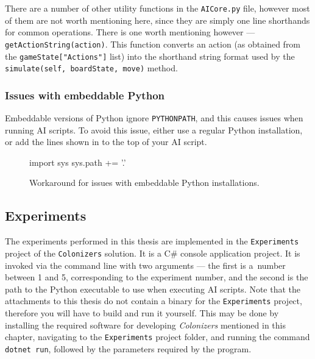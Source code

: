 There are a number of other utility functions in the \texttt{AICore.py} file,
however most of them are not worth mentioning here, since they are simply one line
shorthands for common operations. There is one worth mentioning however ---
\texttt{getActionString(action)}. This function converts an action (as obtained from
the \texttt{gameState["Actions"]} list) into the shorthand string format
used by the \texttt{simulate(self, boardState, move)} method.

\subsubsection{Issues with embeddable Python}
\label{dd:embedpy}

Embeddable versions of Python ignore \texttt{PYTHONPATH}, and this causes issues
when running AI scripts. To avoid this issue, either use a regular Python installation,
or add the lines shown in  to the top of your AI script.

\begin{figure}[ht]
\begin{code}[commandchars=\\\{\},codes={\catcode`\$=3\catcode`\^=7\catcode`\_=8}]
import sys
sys.path += '.'
\end{code}
\caption{Workaround for issues with embeddable Python installations.}
\label{dd:embedex}
\end{figure}

\subsection{Experiments}
\label{chap:experimentdocs}

The experiments performed in this thesis are implemented in the \texttt{Experiments}
project of the \texttt{Colonizers} solution. It is a C\# console application project.
It is invoked via the command line with two arguments --- the first is a~number
between 1 and 5, corresponding to the experiment number, and the second
is the path to the Python executable to use when executing AI scripts.
Note that the attachments to this thesis do not contain a binary
for the \texttt{Experiments} project, therefore you will have to build and
run it yourself. This may be done by installing the required software for
developing \emph{Colonizers} mentioned in this chapter, navigating to the
\texttt{Experiments} project folder, and running the command \texttt{dotnet run},
followed by the parameters required by the program.

